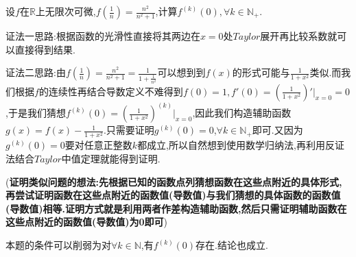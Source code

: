 \documentclass[lang=cn,newtx,10pt,scheme=chinese]{../Template/elegantbook}
\begin{document}
\begin{exercise}
    设\(f\)在\(\mathbb{R}\)上无限次可微,\(f\left(\frac{1}{n}\right)=\frac{n^{2}}{n^{2}+1}\),计算\(f^{(k)}(0), \forall k \in \mathbb{N}_{+}\).
\end{exercise}
\begin{note}
    {\color{blue}证法一思路:}根据函数的光滑性直接将其两边在$x=0$处$Taylor$展开再比较系数就可以直接得到结果.

    {\color{blue}证法二思路:}由$f\left( \frac{1}{n} \right) =\frac{n^2}{n^2+1}=\frac{1}{1+\frac{1}{n^2}}$可以想到到$f(x)$的形式可能与$\frac{1}{1+x^2}$类似.而我们根据$f$的连续性再结合导数定义不难得到$f(0)=1,f'(0)=(\frac{1}{1+x^2})'\Big|_{x = 0}=0$,于是我们猜想$f^{(k)}(0) = (\frac{1}{1 + x^2})^{(k)}\Big|_{x = 0}$,因此我们构造辅助函数\(g(x) = f(x) - \frac{1}{1 + x^2}\).只需要证明\(g^{(k)}(0) = 0\),\(\forall k\in \mathbb{N}_+\)即可.又因为\(g^{(k)}(0) = 0\)要对任意正整数$k$都成立,所以自然想到使用数学归纳法,再利用反证法结合$Taylor$中值定理就能得到证明.

    (\textbf{证明类似问题的想法:先根据已知的函数点列猜想函数在这些点附近的具体形式,再尝试证明函数在这些点附近的函数值(导数值)与我们猜想的具体函数的函数值(导数值)相等.证明方式就是利用两者作差构造辅助函数,然后只需证明辅助函数在这些点附近的函数值(导数值)为0即可})
\end{note}
\begin{remark}
    本题的条件可以削弱为对$\forall k\in \mathbb{N}$,有$f^{(k)}(0)$存在.结论也成立.
\end{remark}
\end{document}
